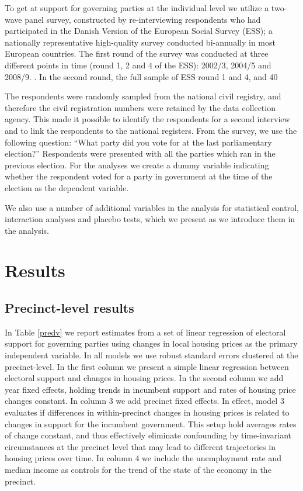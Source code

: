 \documentclass[12pt,a4paper]{article}
\begin{document}
	To get at support for governing parties at the individual level we utilize a two-wave panel survey, constructed by re-interviewing respondents who had participated in the Danish Version of the European Social Survey (ESS); a nationally representative high-quality survey conducted bi-annually in most European countries. The first round of the survey was conducted at three different points in time (round 1, 2 and 4 of the ESS): 2002/3, 2004/5 and 2008/9. . In the second round, the full sample of ESS round 1 and 4, and 40%
	
	The respondents were randomly sampled from the national civil registry, and therefore the civil registration numbers were retained by the data collection agency. This made it possible to identify the respondents for a second interview and to link the respondents to the national registers. From the survey, we use the following question: ``What party did you vote for at the last parliamentary election?'' Respondents were presented with all the parties which ran in the previous election. For the analyses we create a dummy variable indicating whether the respondent voted for a party in government at the time of the election as the dependent variable.
	
	We also use a number of additional variables in the analysis for statistical control, interaction analyses and placebo tests, which we present as we introduce them in the analysis. 
	
	\section{Results}
	
		
	\subsection{Precinct-level results}
	In Table \ref{predv} we report estimates from a set of linear regression of electoral support for governing parties using changes in local housing prices as the primary independent variable. In all models we use robust standard errors clustered at the precinct-level. In the first column we present a simple linear regression between electoral support and changes in housing prices. In the second column we add year fixed effects, holding trends in incumbent support and rates of housing price changes constant. In column 3 we add precinct fixed effects. In effect, model 3 evaluates if differences in within-precinct changes in housing prices is related to changes in support for the incumbent government. This setup hold averages rates of change constant, and thus effectively eliminate confounding by time-invariant circumstances at the precinct level that may lead to different trajectories in housing prices over time. In column 4 we include the unemployment rate and median income as controls for the trend of the state of the economy in the precinct.
	
\end{document}
